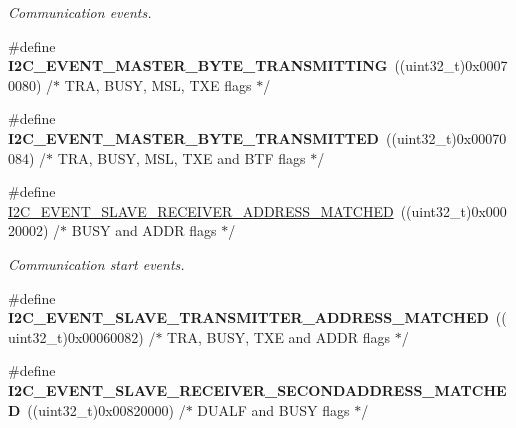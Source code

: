 \begin{DoxyCompactItemize}
\begin{DoxyCompactList}\small\item\em Communication events. \end{DoxyCompactList}\item 
\mbox{\label{group___i2_c___events_ga037ac1e67e44ee085acac6f034bd73b2}} 
\#define {\bfseries I2\+C\+\_\+\+E\+V\+E\+N\+T\+\_\+\+M\+A\+S\+T\+E\+R\+\_\+\+B\+Y\+T\+E\+\_\+\+T\+R\+A\+N\+S\+M\+I\+T\+T\+I\+NG}~((uint32\+\_\+t)0x00070080) /$\ast$ T\+R\+A, B\+U\+S\+Y, M\+S\+L, T\+X\+E flags $\ast$/
\item 
\mbox{\label{group___i2_c___events_ga8fe3b96b54e3c38e1de5d48536039c8f}} 
\#define {\bfseries I2\+C\+\_\+\+E\+V\+E\+N\+T\+\_\+\+M\+A\+S\+T\+E\+R\+\_\+\+B\+Y\+T\+E\+\_\+\+T\+R\+A\+N\+S\+M\+I\+T\+T\+ED}~((uint32\+\_\+t)0x00070084)  /$\ast$ T\+R\+A, B\+U\+S\+Y, M\+S\+L, T\+X\+E and B\+T\+F flags $\ast$/
\item 
\#define \mbox{\hyperlink{group___i2_c___events_ga6cf0e334704618b024eee604849f50f7}{I2\+C\+\_\+\+E\+V\+E\+N\+T\+\_\+\+S\+L\+A\+V\+E\+\_\+\+R\+E\+C\+E\+I\+V\+E\+R\+\_\+\+A\+D\+D\+R\+E\+S\+S\+\_\+\+M\+A\+T\+C\+H\+ED}}~((uint32\+\_\+t)0x00020002) /$\ast$ B\+U\+S\+Y and A\+D\+D\+R flags $\ast$/
\begin{DoxyCompactList}\small\item\em Communication start events. \end{DoxyCompactList}\item 
\mbox{\label{group___i2_c___events_ga3fa381c1fd9a95c8ae13c6cc402b1327}} 
\#define {\bfseries I2\+C\+\_\+\+E\+V\+E\+N\+T\+\_\+\+S\+L\+A\+V\+E\+\_\+\+T\+R\+A\+N\+S\+M\+I\+T\+T\+E\+R\+\_\+\+A\+D\+D\+R\+E\+S\+S\+\_\+\+M\+A\+T\+C\+H\+ED}~((uint32\+\_\+t)0x00060082) /$\ast$ T\+R\+A, B\+U\+S\+Y, T\+X\+E and A\+D\+D\+R flags $\ast$/
\item 
\mbox{\label{group___i2_c___events_ga17e78ab01fa980b3df10f8d9f6864c48}} 
\#define {\bfseries I2\+C\+\_\+\+E\+V\+E\+N\+T\+\_\+\+S\+L\+A\+V\+E\+\_\+\+R\+E\+C\+E\+I\+V\+E\+R\+\_\+\+S\+E\+C\+O\+N\+D\+A\+D\+D\+R\+E\+S\+S\+\_\+\+M\+A\+T\+C\+H\+ED}~((uint32\+\_\+t)0x00820000)  /$\ast$ D\+U\+A\+L\+F and B\+U\+S\+Y flags $\ast$/
\item 
\mbox{\label{group___i2_c___events_ga6221aa204356bec9146f800ccfc99fc1}} 

\end{DoxyCompactItemize}

